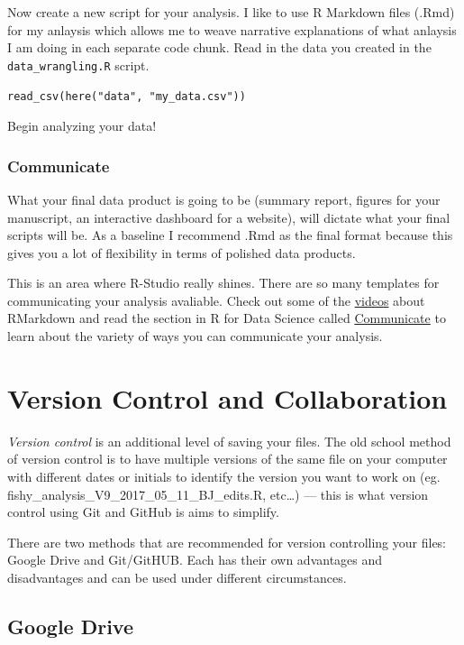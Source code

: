 \documentclass[]{book}
\begin{document}
Now create a new script for your analysis. I like to use R Markdown
files (.Rmd) for my anlaysis which allows me to weave narrative
explanations of what anlaysis I am doing in each separate code chunk.
Read in the data you created in the \texttt{data\_wrangling.R} script.

\texttt{read\_csv(here("data",\ "my\_data.csv"))}

Begin analyzing your data!

\subsection{Communicate}\label{communicate}

What your final data product is going to be (summary report, figures for
your manuscript, an interactive dashboard for a website), will dictate
what your final scripts will be. As a baseline I recommend .Rmd as the
final format because this gives you a lot of flexibility in terms of
polished data products.

This is an area where R-Studio really shines. There are so many
templates for communicating your analysis avaliable. Check out some of
the \href{http://rmarkdown.rstudio.com/lesson-1.html}{videos} about
RMarkdown and read the section in R for Data Science called
\href{http://r4ds.had.co.nz/communicate-intro.html}{Communicate} to
learn about the variety of ways you can communicate your analysis.

\chapter{Version Control and
Collaboration}\label{version-control-and-collaboration}

\emph{Version control} is an additional level of saving your files. The
old school method of version control is to have multiple versions of the
same file on your computer with different dates or initials to identify
the version you want to work on (eg.
fishy\_analysis\_V9\_2017\_05\_11\_BJ\_edits.R, etc\ldots{}) --- this is
what version control using Git and GitHub is aims to simplify.

There are two methods that are recommended for version controlling your
files: Google Drive and Git/GitHUB. Each has their own advantages and
disadvantages and can be used under different circumstances.

\section{Google Drive}\label{google-drive}
\end{document}
